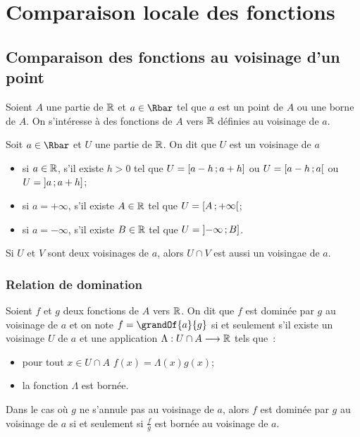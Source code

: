 \chapter{Comparaison locale des fonctions}
\minitoc
\minilof
\minilot

\section{Comparaison des fonctions au voisinage d'un point}

Soient $A$ une partie de $\mathbb{R}$ et $a \in \Rbar$ tel que $a$ est un point de $A$ ou une borne de $A$. On s'intéresse à des fonctions de $A$ vers $\mathbb{R}$ définies au voisinage de $a$.
\begin{defdef}
  Soit $a \in \Rbar$ et $U$ une partie de $\mathbb{R}$. On dit que $U$ est un voisinage de $a$
  \begin{itemize}
  \item si $a \in \mathbb{R}$, s'il existe $h > 0$ tel que $U=\left[ a-h \, ;  a+h \right]$ ou $U=\left[ a-h \, ;  a \right[$ ou $U=\left] a \, ;  a+h \right]$;
  \item si $a=+\infty$, s'il existe $A \in \mathbb{R}$ tel que $U=\left[ A \, ;  +\infty \right[$;
  \item si $a=-\infty$, s'il existe $B \in \mathbb{R}$ tel que $U=\left] -\infty \, ;  B \right]$.
  \end{itemize}
\end{defdef}
\begin{prop}
  Si $U$ et $V$ sont deux voisinages de $a$, alors $U \cap V$ est aussi un voisingae de $a$.
\end{prop}

\subsection{Relation de domination}

\begin{defdef}
  Soient $f$ et $g$ deux fonctions de $A$ vers $\mathbb{R}$. On dit que $f$ est dominée par $g$ au voisinage de $a$ et on note $f=\grandOf{a}{g}$ si et seulement s'il existe un voisinage $U$ de $a$ et une application $\Lambda:U\cap A \longrightarrow \mathbb{R}$ tels que~:
  \begin{itemize}
  \item pour tout $x \in U\cap A$ $f(x)=\Lambda(x)g(x)$;
  \item la fonction $\Lambda$ est bornée.
  \end{itemize}
\end{defdef}
\begin{prop}
  Dans le cas où $g$ ne s'annule pas au voisinage de $a$, alors $f$ est dominée par $g$ au voisinage de $a$ si et seulement si $\frac{f}{g}$ est bornée au voisinage de $a$.
\end{prop}

